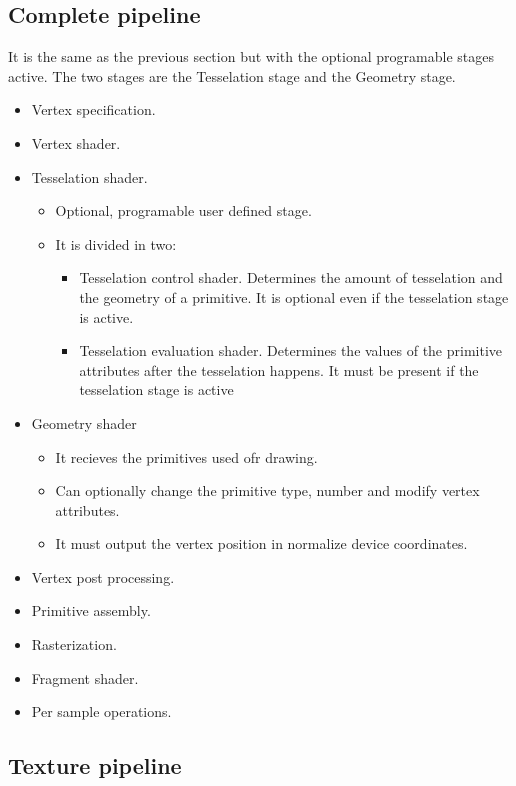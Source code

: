 \subsection{Complete pipeline}
\label{sec:compPipe}

It is the same as the previous section but with the optional programable stages active.
The two stages are the Tesselation stage and the Geometry stage.

\begin{itemize}
 \item Vertex specification.
 \item Vertex shader.
 \item Tesselation shader.
 \begin{itemize}
  \item Optional, programable user defined stage.
  \item It is divided in two:
  \begin{itemize}
   \item Tesselation control shader. Determines the amount of tesselation and the geometry of a primitive. It is optional even if the tesselation stage is active.
   \item Tesselation evaluation shader. Determines the values of the primitive attributes after the tesselation happens. It must be present if the tesselation stage is active
  \end{itemize}
 \end{itemize}
 \item Geometry shader
 \begin{itemize}
  \item It recieves the primitives used ofr drawing.
  \item Can optionally change the primitive type, number and modify vertex attributes.
  \item It must output the vertex position in normalize device coordinates.
 \end{itemize}
 \item Vertex post processing.
 \item Primitive assembly.
 \item Rasterization.
 \item Fragment shader.
 \item Per sample operations.
\end{itemize}

\subsection{Texture pipeline}
\label{sec:textPipe}